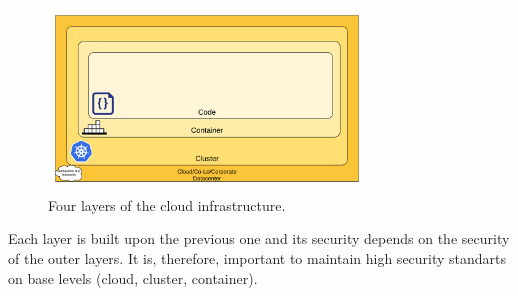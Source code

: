 \begin{figure}[!hbt]
	\begin{center}
		\includegraphics[width=0.75\textwidth]{images/cloud-security.png}
        \caption{Four layers of the cloud infrastructure.}
		\label{img:cloud-security}
	\end{center}
\end{figure}

Each layer is built upon the previous one and its security depends on the security of the outer layers. It is, therefore, important to maintain high security standarts on base levels (cloud, cluster, container).

